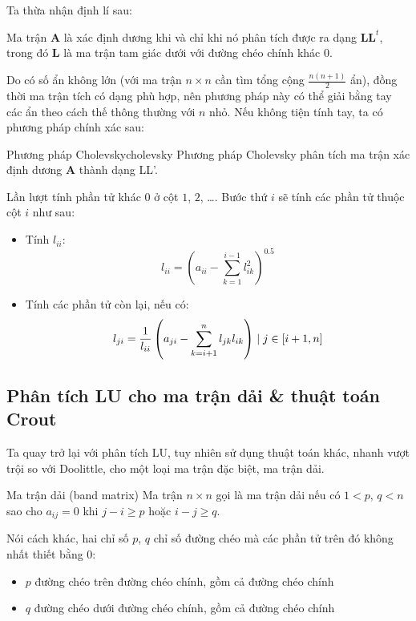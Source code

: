 \documentclass[../../Lectures]{subfiles}
\begin{document}
Ta thừa nhận định lí sau:

\begin{ctheorem}{}{}
    Ma trận \(\bm{A}\) là xác định dương khi và chỉ khi nó phân tích được ra
    dạng \(\bm{L} \bm{L}^t\), trong đó \(\bm{L}\) là ma trận tam giác dưới với
    đường chéo chính khác \(0\).
\end{ctheorem}

Do có số ẩn không lớn (với ma trận \(n \times n\) cần tìm tổng cộng \(\frac{n(n
+ 1)}{2}\) ẩn), đồng thời ma trận tích có dạng phù hợp, nên phương pháp này có
thể giải bằng tay các ẩn theo cách thế thông thường với \(n\) nhỏ. Nếu không
tiện tính tay, ta có phương pháp chính xác sau:

\begin{cmethod}{Phương pháp Cholevsky}{cholevsky}
    Phương pháp Cholevsky phân tích ma trận xác định dương \(\bm{A}\) thành dạng
    LL'.

    Lần lượt tính phần tử khác \(0\) ở cột \(1\), \(2\), \ldots. Bước thứ \(i\)
    sẽ tính các phần tử thuộc cột \(i\) như sau:
    \begin{itemize}
        \item Tính \(l_{ii}\):
            \[l_{ii} = \left(a_{ii} - \sum_{k = 1}^{i - 1} l_{ik}^2\right)^{\num{0.5}}\]

        \item Tính các phần tử còn lại, nếu có:
            \[l_{ji} = \frac{1}{l_{ii}} \left(a_{ji} - \sum_{k = i + 1}^{n} l_{jk} l_{ik}\right) \mid j \in \interval{i + 1}{n}\]
    \end{itemize}
\end{cmethod}

\subsection{Phân tích LU cho ma trận dải \& thuật toán Crout}

Ta quay trở lại với phân tích LU, tuy nhiên sử dụng thuật toán khác, nhanh vượt
trội so với Doolittle, cho một loại ma trận đặc biệt, ma trận dải.

\begin{cdefinition}{Ma trận dải (band matrix)}{}
    Ma trận \(n \times n\) gọi là ma trận dải nếu có \(1 < p \text{, } q < n\)
    sao cho \(a_{ij} = 0\) khi \(j - i \geq p\) hoặc \(i - j \geq q\).
\end{cdefinition}

Nói cách khác, hai chỉ số \(p\), \(q\) chỉ số đường chéo mà các phần tử trên đó
không nhất thiết bằng \(0\):
\begin{itemize}
    \item \(p\) đường chéo trên đường chéo chính, gồm cả đường chéo chính
    \item \(q\) đường chéo dưới đường chéo chính, gồm cả đường chéo chính
\end{itemize}
\end{document}
